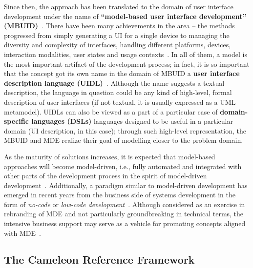 Since then, the approach has been translated to the domain of user interface development under the name of \textbf{\enquote{model-based user interface development} (MBUID)}~\cite{Puerta1994}.
There have been many achievements in the area – the methods progressed from simply generating a UI for a single device to managing the diversity and complexity of interfaces, handling different platforms, devices, interaction modalities, user states and usage contexts~\cite{Meixner2011}.
In all of them, a model is the most important artifact of the development process;
in fact, it is so important that the concept got its own name in the domain of MBUID\,\textendash\,a \textbf{user interface description language (UIDL)}~\cite{guerrero_garcia_theoretical_2009}.
Although the name suggests a textual description, the language in question could be any kind of high-level, formal description of user interfaces (if not textual, it is usually expressed as a UML metamodel).
UIDLs can also be viewed as a part of a particular case of \textbf{domain-specific languages (DSLs)}\,\textendash\,languages designed to be useful in a particular domain (UI description, in this case);
through such high-level representation, the MBUID and MDE realize their goal of modelling closer to the problem domain.

As the maturity of solutions increases, it is expected that model-based approaches will become model-driven, i.e., fully automated and integrated with other parts of the development process in the spirit of model-driven development~\cite{Ruiz2018}.
Additionally, a paradigm similar to model-driven development has emerged in recent years from the business side of systems development in the form of \emph{no-code} or \emph{low-code development}~\cite{Rymer2019}.
Although considered as an exercise in rebranding of MDE and not particularly groundbreaking in technical terms, the intensive business support may serve as a vehicle for promoting concepts aligned with MDE~\cite{Bock2021}.

\subsection{The Cameleon Reference Framework}\label{subsec:the-cameleon-reference-framework}

